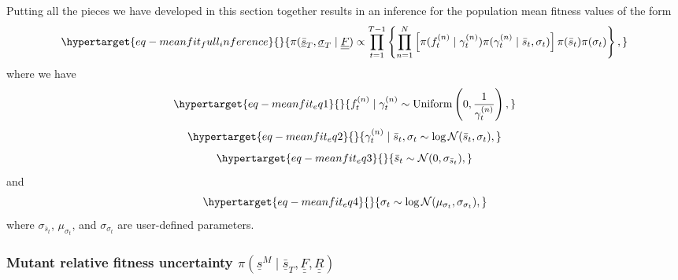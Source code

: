 \documentclass[
]{scrartcl}
\begin{document}
\begin{refsegment}
Putting all the pieces we have developed in this section together
results in an inference for the population mean fitness values of the
form \begin{equation}\protect\hypertarget{eq-meanfit_full_inference}{}{
\pi(
    \underline{\bar{s}}_T, \underline{\sigma}_T \mid \underline{\underline{F}}
) \propto
\prod_{t=1}^{T-1} \left\{
    \prod_{n=1}^N \left[
        \pi(f_t^{(n)} \mid \gamma_t^{(n)}) 
        \pi(\gamma_t^{(n)} \mid \bar{s}_t, \sigma_t)
    \right]
    \pi(\bar{s}_t) \pi(\sigma_t)
\right\},
}\label{eq-meanfit_full_inference}\end{equation} where we have
\begin{equation}\protect\hypertarget{eq-meanfit_eq1}{}{
f_t^{(n)} \mid \gamma_t^{(n)} \sim 
\operatorname{Uniform} \left(0, \frac{1}{\gamma_t^{(n)}} \right),
}\label{eq-meanfit_eq1}\end{equation}
\begin{equation}\protect\hypertarget{eq-meanfit_eq2}{}{
\gamma_t^{(n)} \mid \bar{s}_t, \sigma_t \sim 
\log\mathcal{N}(\bar{s}_t, \sigma_t),
}\label{eq-meanfit_eq2}\end{equation}
\begin{equation}\protect\hypertarget{eq-meanfit_eq3}{}{
\bar{s}_t \sim \mathcal{N}(0, \sigma_{\bar{s}_t}),
}\label{eq-meanfit_eq3}\end{equation} and
\begin{equation}\protect\hypertarget{eq-meanfit_eq4}{}{
\sigma_t \sim \log\mathcal{N}(\mu_{\sigma_t}, \sigma_{\sigma_t}),
}\label{eq-meanfit_eq4}\end{equation} where \(\sigma_{\bar{s}_t}\),
\(\mu_{\sigma_t}\), and \(\sigma_{\sigma_t}\) are user-defined
parameters.

\hypertarget{sec-bayes_mutfit}{%
\subsubsection{\texorpdfstring{Mutant relative fitness uncertainty
\(\pi(\underline{s}^M \mid \underline{\bar{s}}_T, \underline{\underline{F}}, \underline{\underline{R}})\)}{Mutant relative fitness uncertainty \textbackslash pi(\textbackslash underline\{s\}\^{}M \textbackslash mid \textbackslash underline\{\textbackslash bar\{s\}\}\_T, \textbackslash underline\{\textbackslash underline\{F\}\}, \textbackslash underline\{\textbackslash underline\{R\}\})}}\label{sec-bayes_mutfit}}


\end{refsegment}
\end{document}
